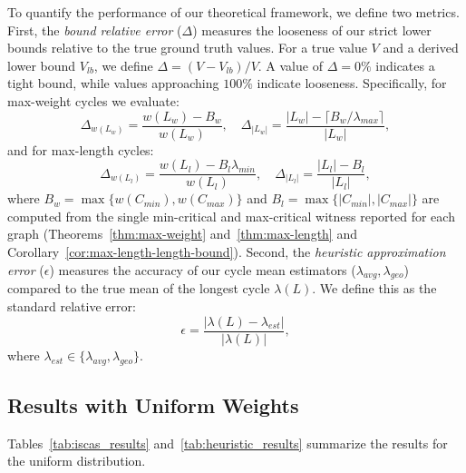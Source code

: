 \documentclass{article}
\theoremstyle{definition}
\begin{document}
To quantify the performance of our theoretical framework, we define two
metrics. First, the \textit{bound relative error} ($\Delta$) measures
the looseness of our strict lower bounds relative to the true ground
truth values. For a true value $V$ and a derived lower bound $V_{lb}$, we
define $\Delta = (V - V_{lb})/V$. A value of $\Delta = 0\%$ indicates a
tight bound, while values approaching $100\%$ indicate looseness.
Specifically, for max-weight cycles we evaluate:
\begin{equation}
  \Delta_{w(L_w)} = \frac{w(L_w) - B_w}{w(L_w)}, \quad
  \Delta_{|L_w|} = \frac{|L_w| - \lceil B_w/\lambda_{max} \rceil}{|L_w|},
\end{equation}
and for max-length cycles:
\begin{equation}
  \Delta_{w(L_l)} = \frac{w(L_l) - B_l\lambda_{min}}{w(L_l)}, \quad
  \Delta_{|L_l|} = \frac{|L_l| - B_l}{|L_l|},
\end{equation}
where $B_w = \max\{w(C_{min}), w(C_{max})\}$ and $B_l = \max\{|C_{min}|,
|C_{max}|\}$ are computed from the single min-critical and
max-critical witness reported for each graph
(Theorems~\ref{thm:max-weight} and~\ref{thm:max-length} and
Corollary~\ref{cor:max-length-length-bound}).
Second, the \textit{heuristic approximation error} ($\epsilon$)
measures the accuracy of our cycle mean estimators ($\lambda_{avg},
\lambda_{geo}$) compared to the true mean of the longest cycle
$\lambda(L)$. We define this as the standard relative error:
\begin{equation}
  \epsilon = \frac{|\lambda(L) - \lambda_{est}|}{|\lambda(L)|},
\end{equation}
where $\lambda_{est} \in \{\lambda_{avg}, \lambda_{geo}\}$.

\subsection{Results with Uniform Weights}

Tables~\ref{tab:iscas_results} and~\ref{tab:heuristic_results}
summarize the results for the uniform distribution.
\end{document}
